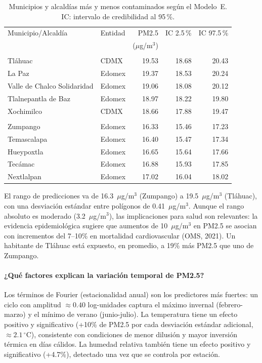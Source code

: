 ﻿\documentclass[12pt]{article}
\begin{document}
\begin{table}[H]
\centering
\caption{Municipios y alcald\'ias m\'as y menos contaminados seg\'un el Modelo~E.
         IC: intervalo de credibilidad al 95\,\%.}
\label{tab:prediccionE}
\small
\begin{tabular}{>{\raggedright\arraybackslash}p{5cm}>{\raggedright\arraybackslash}p{1.8cm}rrr}
\toprule
Municipio/Alcald\'ia & Entidad & PM2.5 & IC 2.5\,\% & IC 97.5\,\% \\
                     &         & ($\mu$g/m$^3$) & & \\
\midrule
\multicolumn{5}{l}{\textit{Zonas m\'as contaminadas}} \\
Tl\'ahuac            & CDMX   & 19.53 & 18.68 & 20.43 \\
La Paz               & Edomex & 19.37 & 18.53 & 20.24 \\
Valle de Chalco Solidaridad & Edomex & 19.06 & 18.08 & 20.12 \\
Tlalnepantla de Baz  & Edomex & 18.97 & 18.22 & 19.80 \\
Xochimilco           & CDMX   & 18.66 & 17.88 & 19.47 \\
\midrule
\multicolumn{5}{l}{\textit{Zonas menos contaminadas}} \\
Zumpango             & Edomex & 16.33 & 15.46 & 17.23 \\
Temascalapa          & Edomex & 16.40 & 15.47 & 17.34 \\
Hueypoxtla           & Edomex & 16.65 & 15.64 & 17.66 \\
Tec\'amac            & Edomex & 16.88 & 15.93 & 17.85 \\
Nextlalpan           & Edomex & 17.02 & 16.04 & 18.02 \\
\bottomrule
\end{tabular}
\normalsize
\end{table}

El rango de predicciones va de 16.3~$\mu$g/m$^3$ (Zumpango) a
19.5~$\mu$g/m$^3$ (Tl\'ahuac), con una desviaci\'on est\'andar entre
pol\'igonos de 0.41~$\mu$g/m$^3$.
Aunque el rango absoluto es moderado (3.2~$\mu$g/m$^3$), las implicaciones
para salud son relevantes: la evidencia epidemiol\'ogica sugiere que
aumentos de 10~$\mu$g/m$^3$ en PM2.5 se asocian con incrementos del
7--10\% en mortalidad cardiovascular (OMS, 2021).
Un habitante de Tl\'ahuac est\'a expuesto, en promedio, a 19\% m\'as
PM2.5 que uno de Zumpango.


\paragraph{¿Qu\'e factores explican la variaci\'on temporal de PM2.5?}
Los t\'erminos de Fourier (estacionalidad anual) son los predictores
m\'as fuertes: un ciclo con amplitud $\approx 0.40$ log-unidades captura
el m\'aximo invernal (febrero-marzo) y el m\'inimo de verano (junio-julio).
La temperatura tiene un efecto positivo y significativo
(+10\% de PM2.5 por cada desviaci\'on est\'andar adicional, $\approx 2.1\,^\circ$C),
consistente con condiciones de menor dilusi\'on y mayor inversi\'on
t\'ermica en d\'ias c\'alidos.
La humedad relativa tambi\'en tiene un efecto positivo y significativo
(+4.7\%), detectado una vez que se controla por estaci\'on.
\end{document}
